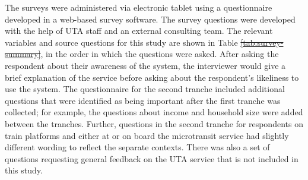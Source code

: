 \documentclass[smartcities,article,submit,moreauthors,pdftex]{Definitions/mdpi}
\providecommand{\DIFadd}[1]{{\protect\color{blue}\uwave{#1}}} %
\providecommand{\DIFdel}[1]{{\protect\color{red}\sout{#1}}}                      %
\providecommand{\DIFaddbegin}{} %
\providecommand{\DIFaddend}{} %
\providecommand{\DIFdelbegin}{} %
\providecommand{\DIFdelend}{} %
\begin{document}
The surveys were administered via electronic tablet using a questionnaire developed in a web-based survey software. The survey questions were developed with the help of UTA staff and an external consulting team. The relevant variables and source questions for this study are shown in Table \DIFdelbegin \DIFdel{\ref{tab:survey-summary}}\DIFdelend \DIFaddbegin \DIFadd{\ref{tab:survey-questions}}\DIFaddend , in the order in which the questions were asked. After asking the respondent about their awareness of the system, the interviewer would give a brief explanation of the service before asking about the respondent’s likeliness to use the system. The questionnaire for the second tranche included additional questions that were identified as being important after the first tranche was collected; for example, the questions about income and household size were added between the tranches. Further, questions in the second tranche for respondents on train platforms and either at or on board the microtransit service had slightly different wording to reflect the separate contexts. There was also a set of questions requesting general feedback on the UTA service that is not included in this study.
\end{document}
